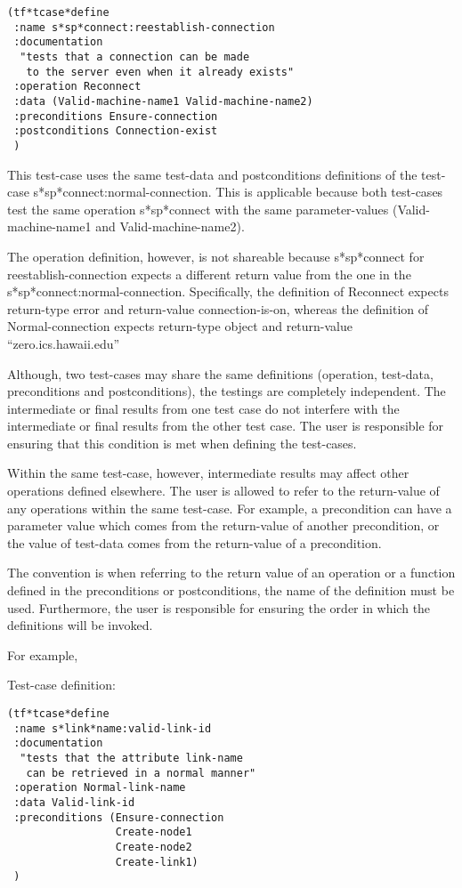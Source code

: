 \small\begin{verbatim}
(tf*tcase*define
 :name s*sp*connect:reestablish-connection
 :documentation  
  "tests that a connection can be made 
   to the server even when it already exists"
 :operation Reconnect
 :data (Valid-machine-name1 Valid-machine-name2)
 :preconditions Ensure-connection
 :postconditions Connection-exist
 )
\end{verbatim}\normalsize

This test-case uses the same test-data and postconditions definitions
of the test-case s*sp*connect:normal-connection.  
This is applicable because both test-cases test the same operation
s*sp*connect with the same parameter-values (Valid-machine-name1 and
Valid-machine-name2).

The operation definition, however, is not shareable because s*sp*connect
for reestablish-connection expects a different return value  from the one
in the s*sp*connect:normal-connection.  Specifically, the definition of
Reconnect expects return-type error and return-value connection-is-on, 
whereas the definition of Normal-connection expects return-type object
and return-value ``zero.ics.hawaii.edu''

Although, two test-cases may share the same definitions (operation, test-data,
preconditions and postconditions), the testings are completely independent.
The intermediate or final results from one test case do not interfere
with the intermediate or final results from the other test case.
The user is responsible for ensuring that this condition is met
when defining the test-cases.
 
Within the same test-case, however, intermediate results may affect other 
operations defined elsewhere. The user is allowed
to refer to the return-value of any operations within the same test-case.
For example, a precondition can have a parameter value which comes from 
the return-value of another precondition, or the value of test-data comes 
from the return-value of a precondition.  

The convention is when referring to the return value
of an operation or a function defined in the preconditions or 
postconditions, the name of the definition must be used.
Furthermore, the user is responsible for ensuring the order in which
the definitions will be invoked.

\noindent For example,

\noindent Test-case definition:

\small\begin{verbatim}
(tf*tcase*define
 :name s*link*name:valid-link-id
 :documentation 
  "tests that the attribute link-name 
   can be retrieved in a normal manner"
 :operation Normal-link-name
 :data Valid-link-id
 :preconditions (Ensure-connection 
                 Create-node1 
                 Create-node2 
                 Create-link1)
 )
\end{verbatim}\normalsize

